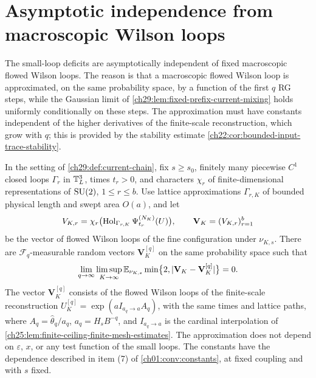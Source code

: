 \section{Asymptotic independence from macroscopic Wilson loops}\label{ch29:sec:macroscopic}

The small-loop deficits are asymptotically independent of fixed macroscopic flowed Wilson loops. The reason is that a macroscopic flowed Wilson loop is approximated, on the same probability space, by a function of the first $q$ RG steps, while the Gaussian limit of \cref{ch29:lem:fixed-prefix-current-mixing} holds uniformly conditionally on these steps. The approximation must have constants independent of the higher derivatives of the finite-scale reconstruction, which grow with $q$; this is provided by the stability estimate \cref{ch22:cor:bounded-input-trace-stability}.

\begin{lemma}\label{ch29:lem:same-history-macroscopic-prefix}
In the setting of \cref{ch29:def:current-chain}, fix $s\ge s_0$, finitely many piecewise $C^1$ closed loops $\Gamma_r$ in $\mathbb T_L^3$, times $t_r>0$, and characters $\chi_r$ of finite-dimensional representations of $\mathrm{SU}(2)$, $1\le r\le b$. Use lattice approximations $\Gamma_{r,K}$ of bounded physical length and swept area $O(a)$, and let
\[
 V_{K,r}=\chi_r\bigl(\operatorname{Hol}_{\Gamma_{r,K}}\Psi^{(N_K)}_{t_r}(U)\bigr),\qquad \mathbf V_K=(V_{K,r})_{r=1}^b
\]
be the vector of flowed Wilson loops of the fine configuration under $\nu_{K,s}$. There are $\mathcal F_q$-measurable random vectors $\mathbf V_K^{[q]}$ on the same probability space such that
\begin{equation}\label{ch29:eq:macroscopic-prefix-approximation}
 \lim_{q\to\infty}\limsup_{K\to\infty}\mathbb E_{\nu_{K,s}}\min\bigl\{2,|\mathbf V_K-\mathbf V_K^{[q]}|\bigr\}=0.
\end{equation}
The vector $\mathbf V_K^{[q]}$ consists of the flowed Wilson loops of the finite-scale reconstruction $U_K^{[q]}=\exp(aI_{a_q\to a}A_q)$, with the same times and lattice paths, where $A_q=\widehat\theta_q/a_q$, $a_q=H_sB^{-q}$, and $I_{a_q\to a}$ is the cardinal interpolation of \cref{ch25:lem:finite-ceiling-finite-mesh-estimates}. The approximation does not depend on $\varepsilon$, $x$, or any test function of the small loops. The constants have the dependence described in item (7) of \cref{ch01:conv:constants}, at fixed coupling and with $s$ fixed.
\end{lemma}

